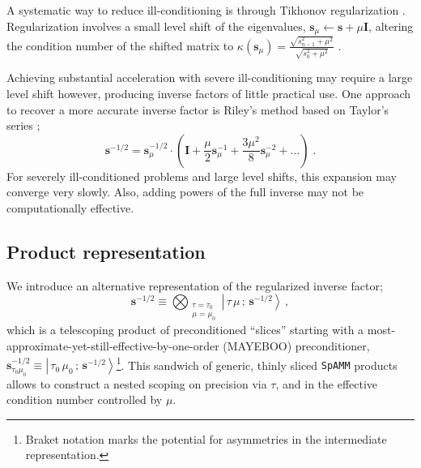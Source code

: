 \documentclass[letterpaper,twocolumn,amsmath,amsfont,amssymb,english,aps,jcp,preprintnumbers,groupaddress,nofootinbib,tightenlines,floatfix]{revtex4}
\newcommand{\mat}[1]{\boldsymbol{#1}}
\theoremstyle{plain}
\theoremstyle{remark}
\theoremstyle{plain}
\begin{document}
A systematic way to reduce ill-conditioning is through Tikhonov regularization \cite{neumaier1998solving,sarra2014}.
Regularization involves a small level shift of the eigenvalues,  $\mat{s}_\mu \leftarrow \mat{s}+\mu \mat{I}$, altering the 
condition number of the shifted matrix to  $\kappa( \mat{s}_\mu) = \frac{\sqrt{s^2_{n-1} + \mu^2}}{\sqrt{s^2_0+\mu^2}}$ \cite{sarra2014}.

Achieving substantial acceleration with severe ill-conditioning  may require a large level shift however, 
producing inverse factors of little practical use.  One approach to recover a more accurate inverse
factor is Riley's method based on Taylor's series \cite{sarra2014}; 
\begin{equation}
\mat{s}^{-1/2} = \mat{s}^{-1/2}_{\mu} \cdot \left( \mat{I}+\frac{\mu}{2} \mat{s}^{-1}_{\mu}
                                                   +\frac{3 \mu^2}{8} \mat{s}^{-2}_{\mu} + \dots
   \right) \; .
\end{equation}
For severely ill-conditioned problems and large level shifts, this expansion may converge very slowly. 
Also, adding powers of the full inverse may not be computationally effective. 

\subsection{Product representation}

We introduce an alternative representation of the regularized inverse factor;
\begin{equation} \label{spammsandwich}
\mat{s}^{-1/2} \equiv \bigotimes_{\substack{\tau=\tau_0 \\ \mu=\mu_0   } } {\left|\, \tau\, \mu \, ; \, \scriptstyle{\mat{s}^{-1/2}}  \right>}  \, ,
\end{equation}
which is a telescoping product of preconditioned ``slices'' 
starting with a most-approximate-yet-still-effective-by-one-order (MAYEBOO) preconditioner, 
$\mat{s}^{-1/2}_{\tau_0 \mu_0} \equiv {\left|\, \tau_0\, \mu_0 \, ; \, \scriptstyle{\mat{s}^{-1/2}}\right>}$\footnote{Braket notation marks 
the potential for asymmetries in the intermediate representation.}.  
This sandwich of generic, thinly sliced {\tt SpAMM} products allows to construct a nested scoping on precision via $\tau$, and in the 
effective condition number controlled by $\mu$.


\end{document}
